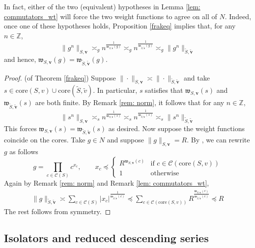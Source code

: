 \documentclass[pdflatex,sn-mathphys-num]{sn-jnl}%
\theoremstyle{thmstyleone}%
\theoremstyle{thmstyletwo}%
\theoremstyle{thmstylethree}%
\begin{document}
In fact, either of the two (equivalent) hypotheses in Lemma \ref{lem: commutators_wt}  will force the two weight functions to agree on all of $N$. Indeed, once one of these hypotheses holds, Proposition  \ref{frakeq} implies that,
    for any $n \in \mathbb{Z}$,
    $$\|g^n\|_{S,\mathbf v} \asymp_g n^\frac{1}{\mathfrak{w}_{S,\mathbf v}(g)}\asymp_g  n^\frac{1}{\mathfrak{w}_{\tilde{S},\tilde{\mathbf v}}(g) }\asymp_g   \|g^n \|_{\tilde{S},\tilde{\mathbf v}}$$
and hence, $\mathfrak{w}_{S,\mathbf v}(g)  = \mathfrak{w}_{\tilde{S},\tilde{\mathbf v}}(g) $.  
\begin{proof} (of Theorem \ref{frakeq})
    Suppose 
$\|\cdot\|_{S,\mathbf v} \asymp  \|\cdot\|_{\tilde{S},\tilde{\mathbf v}}$ and take $s \in \mbox{core}(S,v) \cup \mbox{core}(\tilde{S}, \tilde{v})$. In particular, $s$ satisfies that $\mathfrak{w}_{S,\mathbf v}(s)$ and $\mathfrak{w}_{\tilde{S},\tilde{\mathbf v}}(s)$ are both finite. 
By Remark \ref{rem: norm}, it follows that  for any $n \in \mathbb{Z}$, 
$$\|s^n\|_{S,\mathbf v} \asymp_s n^\frac{1}{\mathfrak{w}_{S,\mathbf v}(s)}\asymp_s  n^\frac{1}{\mathfrak{w}_{\tilde{S},\tilde{\mathbf v}}(s) }\asymp_s   \|s^n \|_{\tilde{S},\tilde{\mathbf v}}$$
This forces  $\mathfrak{w}_{S,\mathbf v}(s) = \mathfrak{w}_{\tilde{S},\tilde{\mathbf v}}(s)$ as desired. 
Now suppose the weight functions coincide on the cores. 
Take $g \in N$ and suppose $\|g\|_{S,\mathbf v} = R$. 
By \cite{SCZ-nil}, we can rewrite $g$ as follows 
$$g = 
\prod_{c \in \mathcal{C}(S)}
c^{x_c}, \qquad x_c   \preccurlyeq 
\begin{cases}
    R^{\mathfrak{w}_{S,\mathbf{v}}(c)} &\text{if }c \in \mathcal{C}(\mbox{core}(S,v)) \\
    1 & \text{otherwise}
\end{cases} $$
Again by Remark \ref{rem: norm} and  Remark \ref{lem: commutators_wt}, 
\begin{align*}
\|g\|_{\tilde{S},\tilde{\mathbf v}}  \asymp 
\sum_{c \in \mathcal{C}(S)}  
|x_c|^\frac{1}{\mathfrak{w}_{\tilde{S},\tilde{\mathbf v}} (c)}    \preccurlyeq  \sum_{c \in \mathcal{C}(\mbox{core}(S,v)) } 
R^\frac{\mathfrak{w}_{S,\mathbf{v}}(c)}{\mathfrak{w}_{\tilde{S},\tilde{\mathbf v}} (c)} 
\preccurlyeq R 
\end{align*}
The rest follows from symmetry. 
 \end{proof}
 


\subsection{Isolators and reduced descending series}
\label{sec: reduced}
\end{document}
